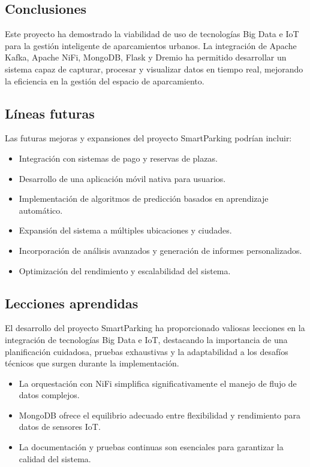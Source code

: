 \documentclass{../../../miPlantilla}
\begin{document}
\subsection{Conclusiones}
Este proyecto ha demostrado la viabilidad de uso de tecnologías Big Data e IoT para la gestión inteligente de aparcamientos urbanos.
La integración de Apache Kafka, Apache NiFi, MongoDB, Flask y Dremio ha permitido desarrollar un sistema capaz de capturar, procesar
y visualizar datos en tiempo real, mejorando la eficiencia en la gestión del espacio de aparcamiento.

\subsection{Líneas futuras}
Las futuras mejoras y expansiones del proyecto SmartParking podrían incluir:
\begin{itemize}
  \item Integración con sistemas de pago y reservas de plazas.
  \item Desarrollo de una aplicación móvil nativa para usuarios.
  \item Implementación de algoritmos de predicción basados en aprendizaje automático.
  \item Expansión del sistema a múltiples ubicaciones y ciudades.
  \item Incorporación de análisis avanzados y generación de informes personalizados.
  \item Optimización del rendimiento y escalabilidad del sistema.
\end{itemize}

\subsection{Lecciones aprendidas}
El desarrollo del proyecto SmartParking ha proporcionado valiosas lecciones en la integración de tecnologías Big Data e IoT,
destacando la importancia de una planificación cuidadosa, pruebas exhaustivas y la adaptabilidad a los desafíos técnicos que surgen durante la implementación.

\begin{itemize}
  \item La orquestación con NiFi simplifica significativamente el manejo de flujo de datos complejos.
  \item MongoDB ofrece el equilibrio adecuado entre flexibilidad y rendimiento para datos de sensores IoT.
  \item La documentación y pruebas continuas son esenciales para garantizar la calidad del sistema.
\end{itemize}
\end{document}
